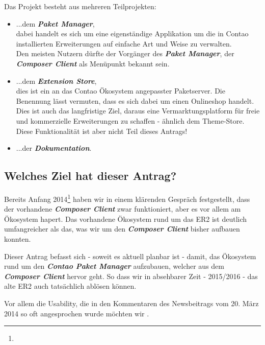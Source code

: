 \documentclass[
paper=a4,
draft=false,%
fontsize=10pt%
]{scrartcl}
\newcommand{\contaoPackageManager}{\textbf{\textit{Contao Paket Manager}}}
\newcommand{\packageManager}{\textbf{\textit{Paket Manager}}}
\newcommand{\store}{\textbf{\textit{Extension Store}}}
\newcommand{\documentation}{\textbf{\textit{Dokumentation}}}
\newcommand{\composerClient}{\textbf{\textit{Composer Client}}}
\begin{document}

Das Projekt besteht aus mehreren Teilprojekten:

\begin{itemize}
\item ...dem \packageManager{}, \\
dabei handelt es sich um eine eigenständige Applikation um die in Contao installierten Erweiterungen auf einfache Art und Weise zu verwalten. \\
Den meisten Nutzern dürfte der Vorgänger des \packageManager{}, der \composerClient{} als Menüpunkt  bekannt sein.

\item ...dem \store{}, \\
dies ist ein an das Contao Ökosystem angepasster Paketserver. Die Benennung lässt vermuten, dass es sich dabei um einen Onlineshop handelt. Dies ist auch das langfristige Ziel, daraus eine Vermarktungsplatform für freie und kommerzielle Erweiterungen zu schaffen - ähnlich dem Theme-Store. Diese Funktionalität ist aber nicht Teil dieses Antrags!

\item ...der \documentation{}.
\end{itemize}

\pagebreak

\subsection*{Welches Ziel hat dieser Antrag?}

Bereits Anfang 2014\footnote{} haben wir in einem klärenden Gespräch festgestellt, dass der vorhandene \composerClient{} zwar funktioniert, aber es vor allem am Ökosystem hapert. Das vorhandene Ökosystem rund um das ER2 ist deutlich umfangreicher als das, was wir um den \composerClient{} bisher aufbauen konnten.

Dieser Antrag befasst sich - soweit es aktuell planbar ist - damit, das Ökosystem rund um den \contaoPackageManager{} aufzubauen, welcher aus dem \composerClient{} hervor geht. So dass wir in absehbarer Zeit - 2015/2016 - das alte ER2 auch tatsächlich ablösen können.

Vor allem die  Usability, die in den Kommentaren des Newsbeitrags vom 20. März 2014 so oft angesprochen wurde möchten wir .
\end{document}
